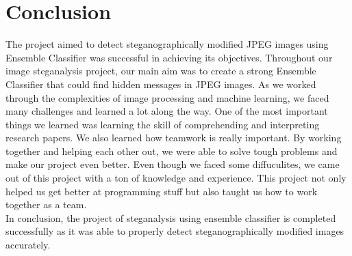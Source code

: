 \chapter{Conclusion}
The project aimed to detect steganographically modified JPEG images using Ensemble Classifier was successful in achieving its objectives. Throughout our image steganalysis project, our main aim was to create a strong Ensemble Classifier that could find hidden messages in JPEG images. As we worked through the complexities of image processing and machine learning, we faced many challenges and learned a lot along the way. One of the most important things we learned was learning the skill of comprehending and interpreting research papers. We also learned how teamwork is really important. By working together and helping each other out, we were able to solve tough problems and make our project even better. Even though we faced some diffuculites, we came out of this project with a ton of knowledge and experience. This project not only helped us get better at programming stuff but also taught us how to work together as a team.\\
In conclusion, the project of steganalysis using ensemble classifier is completed \mbox{successfully} as it was able to properly detect steganographically modified images accurately.

\clearpage


